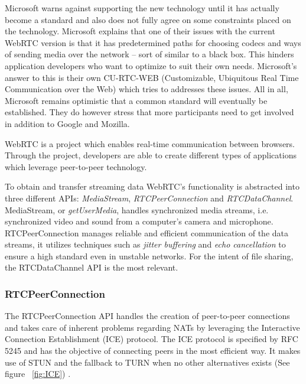 Microsoft warns against supporting the new technology until it has actually become a standard and also does not fully agree on some constraints placed on the technology\cite{WebRTCAndMicrosoft:2012:Online}. Microsoft explains that one of their issues with the current WebRTC version is that it has predetermined paths for choosing codecs and ways of sending media over the network – sort of similar to a black box. This hinders application developers who want to optimize to suit their own needs. Microsoft’s answer to this is their own CU-RTC-WEB (Customizable, Ubiquitous Real Time Communication over the Web) which tries to addresses these issues.
All in all, Microsoft remains optimistic that a common standard will eventually be established\cite{WebRTCAndMicrosoft:2012:Online}. They do however stress that more participants need to get involved in addition to Google and Mozilla. 

WebRTC is a project which enables real-time communication between browsers\cite{WebRTC:Online}. Through the project, developers are able to create different types of applications which leverage peer-to-peer technology.

To obtain and transfer streaming data WebRTC's functionality is abstracted into three different APIs: \emph{MediaStream}, \emph{RTCPeerConnection} and \emph{RTCDataChannel}\cite{WebRTCBasics:2012:Online}. MediaStream, or \emph{getUserMedia}, handles synchronized media streams, i.e. synchronized video and sound from a computer's camera and microphone. RTCPeerConnection manages reliable and efficient communication of the data streams, it utilizes techniques such as \emph{jitter buffering} and \emph{echo cancellation} to ensure a high standard even in unstable networks. For the intent of file sharing, the RTCDataChannel API is the most relevant.

\subsubsection{RTCPeerConnection}
The RTCPeerConnection API handles the creation of peer-to-peer connections and takes care of inherent problems regarding NATs by leveraging the Interactive Connection Establishment (ICE) protocol. The ICE protocol is specified by RFC 5245 and has the objective of connecting peers in the most efficient way. It makes use of STUN and the fallback to TURN when no other alternatives exists (See figure ~\ref{fig:ICE}) \cite{RFC5245:Online}.

